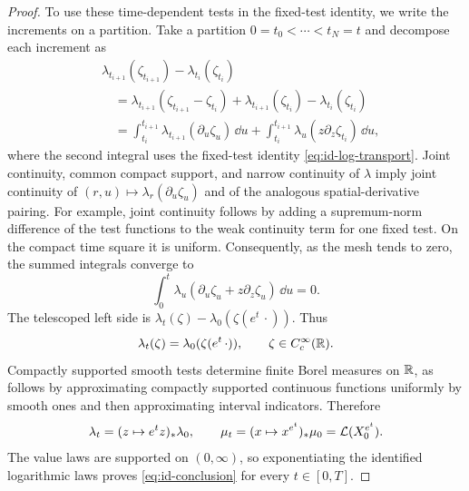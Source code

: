 \begin{proof}
To use these time-dependent tests in the fixed-test identity, we write the increments on a partition.
Take a partition $0=t_0<\cdots<t_N=t$ and decompose each increment as
\[
 \begin{aligned}
 &\lambda_{t_{i+1}}(\zeta_{t_{i+1}})
       -\lambda_{t_i}(\zeta_{t_i})\\
 &\quad=\lambda_{t_{i+1}}(\zeta_{t_{i+1}}-\zeta_{t_i})
       +\lambda_{t_{i+1}}(\zeta_{t_i})
       -\lambda_{t_i}(\zeta_{t_i})\\
 &\quad=\int_{t_i}^{t_{i+1}}
          \lambda_{t_{i+1}}(\partial_u\zeta_u)\,\dd u
       +\int_{t_i}^{t_{i+1}}
          \lambda_u(z\partial_z\zeta_{t_i})\,\dd u,
 \end{aligned}
\]
where the second integral uses the fixed-test identity \eqref{eq:id-log-transport}.
Joint continuity, common compact support, and narrow continuity of $\lambda$ imply joint continuity of $(r,u)\mapsto\lambda_r(\partial_u\zeta_u)$ and of the analogous spatial-derivative pairing.
For example, joint continuity follows by adding a supremum-norm difference of the test functions to the weak continuity term for one fixed test.
On the compact time square it is uniform.
Consequently, as the mesh tends to zero, the summed integrals converge to
\[
 \int_0^t\lambda_u(\partial_u\zeta_u+z\partial_z\zeta_u)\,\dd u=0.
\]
The telescoped left side is $\lambda_t(\zeta)-\lambda_0(\zeta(e^t\,\cdot))$.
Thus
\[
 \lambda_t(\zeta)=\lambda_0(\zeta(e^t\,\cdot)),
 \qquad \zeta\in C_c^\infty(\mathbb R).
\]
Compactly supported smooth tests determine finite Borel measures on $\mathbb R$, as follows by approximating compactly supported continuous functions uniformly by smooth ones and then approximating interval indicators.
Therefore
\begin{equation}
 \lambda_t=(z\mapsto e^t z)_*\lambda_0,
 \qquad
 \mu_t=(x\mapsto x^{e^t})_*\mu_0=\mathcal L(X_0^{e^t}).
 \label{eq:id-transport-identification}
\end{equation}
The value laws are supported on $(0,\infty)$, so exponentiating the identified logarithmic laws proves \eqref{eq:id-conclusion} for every $t\in[0,T]$.
\end{proof}
